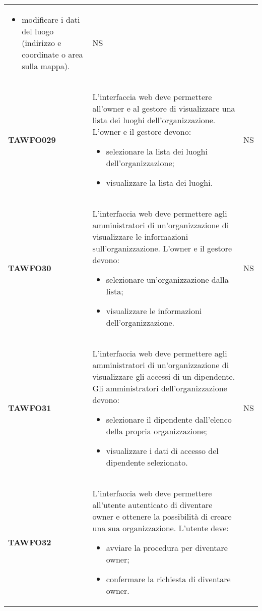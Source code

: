 \documentclass[../piano-di-qualifica.tex]{subfiles}
\begin{document}
\begin{centering}
\begin{longtable}[H]{>{\centering\bfseries}m{3cm} >{}p{10cm} >{\centering\arraybackslash}m{3cm}}
\begin{itemize}
         \item modificare i dati del luogo (indirizzo e coordinate o area sulla mappa).
        \end{itemize}
        & NS \\
        TAWFO029      & L’interfaccia web deve permettere all’owner e al gestore di visualizzare una lista dei luoghi dell’organizzazione. \newline
        L’owner e il gestore devono: 
        \begin{itemize} 
         \item selezionare la lista dei luoghi dell'organizzazione;
         \item visualizzare la lista dei luoghi.
        \end{itemize}
        & NS \\
        TAWFO30      & L’interfaccia web deve permettere agli amministratori di un’organizzazione di visualizzare le informazioni sull’organizzazione. \newline
        L’owner e il gestore devono: 
        \begin{itemize} 
         \item selezionare un'organizzazione dalla lista;
         \item visualizzare le informazioni dell'organizzazione.
        \end{itemize}
        & NS \\
        TAWFO31      & L’interfaccia web deve permettere agli amministratori di un’organizzazione di visualizzare gli accessi di un dipendente. \newline
        Gli amministratori dell'organizzazione devono: 
        \begin{itemize} 
         \item selezionare il dipendente dall'elenco della propria organizzazione;
         \item visualizzare i dati di accesso del dipendente selezionato.
        \end{itemize}
        & NS \\
        TAWFO32      & L’interfaccia web deve permettere all’utente autenticato di diventare owner e ottenere la possibilità di creare una sua organizzazione. \newline
        L'utente deve: 
        \begin{itemize} 
         \item avviare la procedura per diventare owner;
         \item confermare la richiesta di diventare owner.

\end{itemize}
\end{longtable}
\end{centering}
\end{document}
